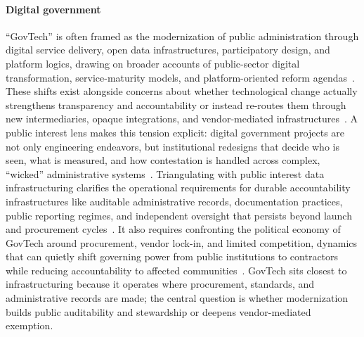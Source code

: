 \documentclass[acmsmall,screen]{acmart}
\begin{document}
\paragraph*{Digital government}
``GovTech'' is often framed as the modernization of public administration through digital service delivery, open data infrastructures, participatory design, and platform logics, drawing on broader accounts of public-sector digital transformation, service-maturity models, and platform-oriented reform agendas~\cite{eomDigitalGovernmentTransformation2022,layneDevelopingFullyFunctional2001,brownAppraisingImpactRole2017}. These shifts exist alongside concerns about whether technological change actually strengthens transparency and accountability or instead re-routes them through new intermediaries, opaque integrations, and vendor-mediated infrastructures~\cite{bertotUsingICTsCreate2010,bharosaRiseGovTechTrojan2022,silvePoliticalEconomyGovTech2023}. A public interest lens makes this tension explicit: digital government projects are not only engineering endeavors, but institutional redesigns that decide who is seen, what is measured, and how contestation is handled across complex, ``wicked'' administrative systems~\cite{gil-garciaDigitalGovernmentPublic2018,kimDigitalGovernmentWicked2016,twizeyimanaPublicValueEGovernment2019}. Triangulating with public interest data infrastructuring clarifies the operational requirements for durable accountability infrastructures like auditable administrative records, documentation practices, public reporting regimes, and independent oversight that persists beyond launch and procurement cycles~\cite{panagiotopoulosPublicValueCreation2019,zuiderwijkOpenDataPolicies2014b,bertotUsingICTsCreate2010}. It also requires confronting the political economy of GovTech around procurement, vendor lock-in, and limited competition, dynamics that can quietly shift governing power from public institutions to contractors while reducing accountability to affected communities~\cite{silvePoliticalEconomyGovTech2023,bharosaRiseGovTechTrojan2022,brownAppraisingImpactRole2017}. GovTech sits closest to infrastructuring because it operates where procurement, standards, and administrative records are made; the central question is whether modernization builds public auditability and stewardship or deepens vendor-mediated exemption.
\end{document}
